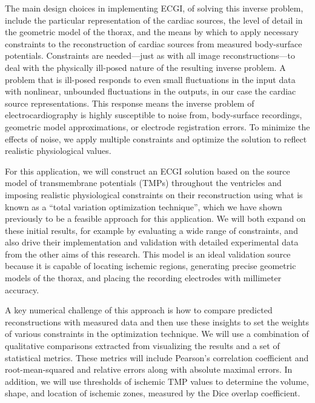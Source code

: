 The main design choices in implementing ECGI, \ie{} of solving this inverse
problem, include the particular representation of the cardiac sources, the
level of detail in the geometric model of the thorax, and the means by
which to apply necessary constraints to the reconstruction of cardiac
sources from measured body-surface potentials.  Constraints are
needed---just as with all image reconstructions---to deal with the
physically ill-posed nature of the resulting inverse problem. A problem
that is ill-posed responds to even small fluctuations in the input data
with nonlinear, unbounded fluctuations in the outputs, in our case the
cardiac source representations. This response means the inverse problem of
electrocardiography is highly susceptible to noise from, \eg{} body-surface
recordings, geometric model approximations, or electrode registration
errors. To minimize the effects of noise, we apply multiple constraints and
optimize the solution to reflect realistic physiological values.

For this application, we will construct an ECGI solution based on the
source model of transmembrane potentials (TMPs) throughout the ventricles
and imposing realistic physiological constraints on their reconstruction
using what is known as a ``total variation optimization technique'', which
we have shown previously to be a feasible approach for this
application. \cite{RSM:Wan2011b,RSM:Wan2013} We will both expand on these
initial results, for example by evaluating a wide range of constraints, and
also drive their implementation and validation with detailed experimental
data from the other aims of this research. This model is an ideal
validation source because it is capable of locating ischemic regions,
generating precise geometric models of the thorax, and placing the
recording electrodes with millimeter accuracy. 

A key numerical challenge of this approach is how to compare predicted
reconstructions with measured data and then use these insights to set the
weights of various constraints in the optimization technique.  We will use
a combination of qualitative comparisons extracted from visualizing the
results and a set of statistical metrics. These metrics will include
Pearson's correlation coefficient and root-mean-squared and relative errors
along with absolute maximal errors.  In addition, we will use thresholds of
ischemic TMP values to determine the volume, shape, and location of
ischemic zones, measured by the Dice overlap coefficient.

